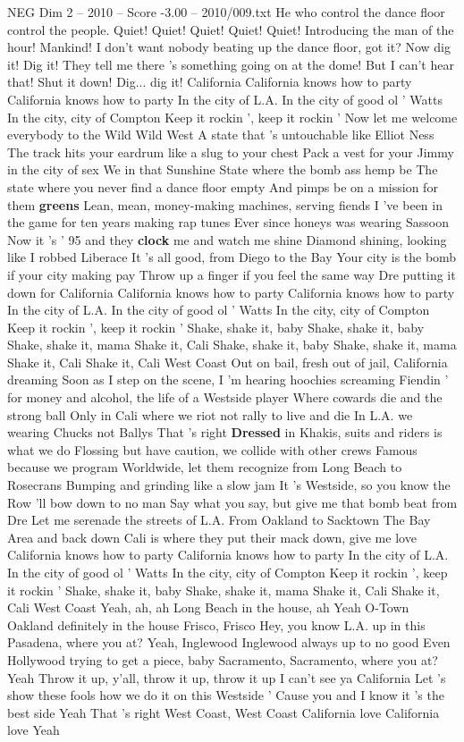 \begin{textsample}{NEG Dim 2 – 2010 – Score -3.00 – 2010/009.txt}  \label{ex:f2_neg_006}
He who control the dance floor control the people.
Quiet!
Quiet!
Quiet!
Quiet!
Quiet!
Introducing the man of the hour!
Mankind!
I don't want nobody beating up the dance floor, got it?
Now dig it!
Dig it!
They tell me there 's something going on at the dome!
But I can't hear that!
Shut it down!
Dig... dig it!
California California knows how to party California knows how to party In the city of L.A.
In the city of good ol ' Watts In the city, city of Compton Keep it rockin ', keep it rockin ' Now let me welcome everybody to the Wild Wild West A state that 's untouchable like Elliot Ness The track hits your eardrum like a slug to your chest Pack a vest for your Jimmy in the city of sex We in that Sunshine State where the bomb ass hemp be The state where you never find a dance floor empty And pimps be on a mission for them \textbf{greens} Lean, mean, money-making machines, serving fiends I 've been in the game for ten years making rap tunes Ever since honeys was wearing Sassoon Now it 's ' 95 and they \textbf{clock} me and watch me shine Diamond shining, looking like I robbed Liberace It 's all good, from Diego to the Bay Your city is the bomb if your city making pay Throw up a finger if you feel the same way Dre putting it down for California California knows how to party California knows how to party In the city of L.A.
In the city of good ol ' Watts In the city, city of Compton Keep it rockin ', keep it rockin ' Shake, shake it, baby Shake, shake it, baby Shake, shake it, mama Shake it, Cali Shake, shake it, baby Shake, shake it, mama Shake it, Cali Shake it, Cali West Coast Out on bail, fresh out of jail, California dreaming Soon as I step on the scene, I 'm hearing hoochies screaming Fiendin ' for money and alcohol, the life of a Westside player Where cowards die and the strong ball Only in Cali where we riot not rally to live and die In L.A. we wearing Chucks not Ballys That 's right \textbf{Dressed} in Khakis, suits and riders is what we do Flossing but have caution, we collide with other crews Famous because we program Worldwide, let them recognize from Long Beach to Rosecrans Bumping and grinding like a slow jam It 's Westside, so you know the Row 'll bow down to no man Say what you say, but give me that bomb beat from Dre Let me serenade the streets of L.A.
From Oakland to Sacktown The Bay Area and back down Cali is where they put their mack down, give me love California knows how to party California knows how to party In the city of L.A.
In the city of good ol ' Watts In the city, city of Compton Keep it rockin ', keep it rockin ' Shake, shake it, baby Shake, shake it, mama Shake it, Cali Shake it, Cali West Coast Yeah, ah, ah Long Beach in the house, ah Yeah O-Town Oakland definitely in the house Frisco, Frisco Hey, you know L.A. up in this Pasadena, where you at?
Yeah, Inglewood Inglewood always up to no good Even Hollywood trying to get a piece, baby Sacramento, Sacramento, where you at?
Yeah Throw it up, y'all, throw it up, throw it up I can't see ya California Let 's show these fools how we do it on this Westside ' Cause you and I know it 's the best side Yeah That 's right West Coast, West Coast California love California love Yeah

\end{textsample}
